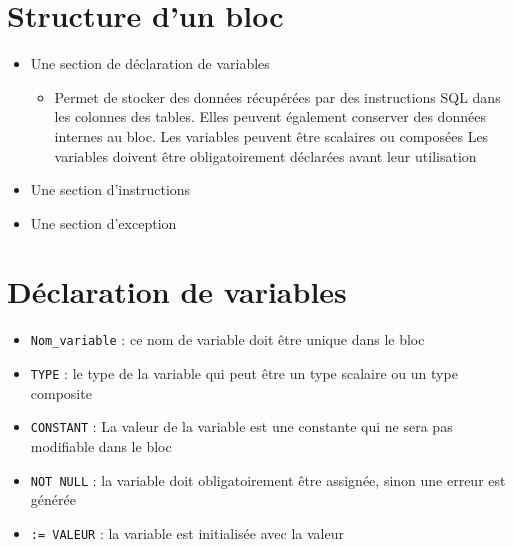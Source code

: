 \documentclass[10pt]{beamer}
\begin{document}
\section{Structure d'un bloc}
\begin{frame}{\secname}
    
\end{frame}

\begin{frame}{\secname}
    \begin{itemize}
        \item Une section de déclaration de variables
              \begin{itemize}
                  \item Permet de stocker des données récupérées par des instructions SQL dans les colonnes des tables.  Elles peuvent également conserver des données internes au bloc.
                        Les variables peuvent être scalaires ou composées
                        Les variables doivent être obligatoirement déclarées avant leur utilisation
              \end{itemize}
        \item Une section d'instructions
        \item Une section d'exception
    \end{itemize}
\end{frame}

\section{Déclaration de variables}
\begin{frame}{\secname}
    
    \begin{itemize}
        \item \lstinline[language=bnf]!Nom_variable! : ce nom de variable doit être unique dans le bloc
        \item \lstinline[language=bnf]!TYPE! : le type de la variable qui peut être un type scalaire ou un type composite
        \item \lstinline[language=bnf]!CONSTANT! : La valeur de la variable est une constante qui ne sera pas modifiable dans le bloc
        \item \lstinline[language=bnf]!NOT NULL! : la variable doit obligatoirement être assignée, sinon une erreur est générée
        \item \lstinline[language=bnf]!:= VALEUR! : la variable est initialisée avec la valeur
    \end{itemize}
\end{frame}
\end{document}
